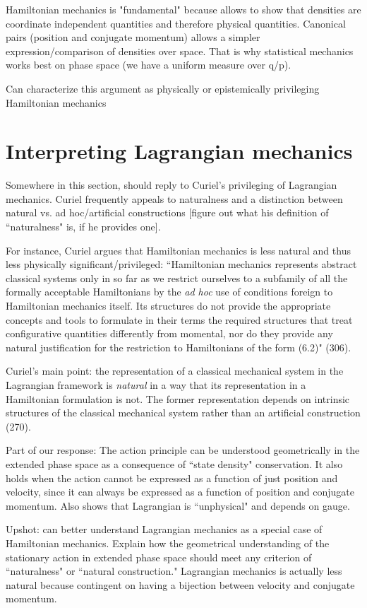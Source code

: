 \documentclass[letterpaper]{article}
\begin{document}
Hamiltonian mechanics is "fundamental" because allows to show that densities are coordinate independent quantities and therefore physical quantities. Canonical pairs (position and conjugate momentum) allows a simpler expression/comparison of densities over space. That is why statistical mechanics works best on phase space (we have a uniform measure over q/p).

Can characterize this argument as physically or epistemically privileging Hamiltonian mechanics 

\section{Interpreting Lagrangian mechanics}

Somewhere in this section, should reply to Curiel's privileging of Lagrangian mechanics. Curiel frequently appeals to naturalness and a distinction between natural vs. ad hoc/artificial constructions [figure out what his definition of ``naturalness" is, if he provides one].

For instance, Curiel argues that Hamiltonian mechanics is less natural and thus less physically significant/privileged:  ``Hamiltonian mechanics represents abstract classical systems only in so far as we restrict ourselves to a subfamily of all the formally acceptable Hamiltonians by the \textit{ad hoc} use of conditions foreign to Hamiltonian mechanics itself. Its structures do not provide the appropriate concepts and tools to formulate in their terms the required structures that treat configurative quantities differently from momental, nor do they provide any natural justification for the restriction to Hamiltonians of the form (6.2)" (306). 

Curiel's main point: the representation of a classical mechanical system in the Lagrangian framework is \textit{natural} in a way that its representation in a Hamiltonian formulation is not. The former representation depends on intrinsic structures of the classical mechanical system rather than an artificial construction (270).

Part of our response: The action principle can be understood geometrically in the extended phase space as a consequence of ``state density" conservation. It also holds when the action cannot be expressed as a function of just position and velocity, since it can always be expressed as a function of position and conjugate momentum. Also shows that Lagrangian is ``unphysical" and depends on gauge.


Upshot: can better understand Lagrangian mechanics as a special case of Hamiltonian mechanics. Explain how the geometrical understanding of the stationary action in extended phase space should meet any criterion of ``naturalness" or ``natural construction." Lagrangian mechanics is actually less natural because contingent on having a bijection between velocity and conjugate momentum.


\end{document}
